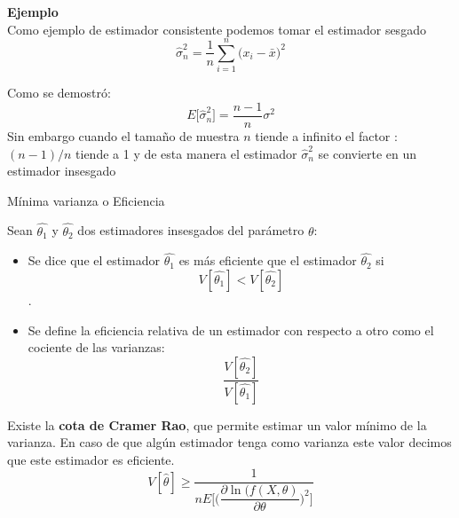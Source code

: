 \documentclass[base=hide,11pt]{elegantbook}
\begin{document}
{\textcolor{col3}{\bf \large Ejemplo}\\
Como ejemplo de estimador consistente podemos tomar el estimador sesgado $$\widehat{\sigma}^{2}_{n} = \dfrac{1}{n}\sum_{i=1}^{n} \big(x_{i}-\bar{x}\big)^{2}$$
			
Como se demostró:
$$E\big[\widehat{\sigma}^{2}_{n}\big]= \dfrac{n-1}{n} \sigma^{2}$$
Sin embargo cuando el tamaño de muestra $n$ tiende a infinito el factor : $(n-1)/n$ tiende a 1 y de esta manera el estimador $\widehat{\sigma}^{2}_{n}$ se convierte en un estimador insesgado

                                           
\begin{Box2}{Mínima varianza o Eficiencia}
			
Sean $\widehat{\theta_{1}}$ y $\widehat{\theta_{2}}$ dos estimadores insesgados del parámetro $\theta$:
\begin{itemize}
\item Se dice que el estimador $\widehat{\theta_{1}}$ es más eficiente que el estimador $\widehat{\theta_{2}}$ si $$V[\widehat{\theta_{1}}]<V[\widehat{\theta_{2}}]$$.
\item Se define la eficiencia relativa de un estimador con respecto a otro como el cociente de las varianzas:
$$\frac{V[\widehat{\theta_{2}}]}{V[\widehat{\theta_{1}}]}$$
\end{itemize}		
\end{Box2}		
		
			Existe la {\bf cota de Cramer Rao}, que permite estimar un valor mínimo de la varianza. En caso de que algún estimador tenga como varianza este valor decimos que este estimador es eficiente. \\
			
			$$V[\widehat{\theta}] \geq \dfrac{1}{n E \Bigg[\Bigg(\dfrac{\partial \ln(f(X,\theta)}{\partial \theta}\Bigg)^{2} \Bigg]} $$
			
}
\end{document}
